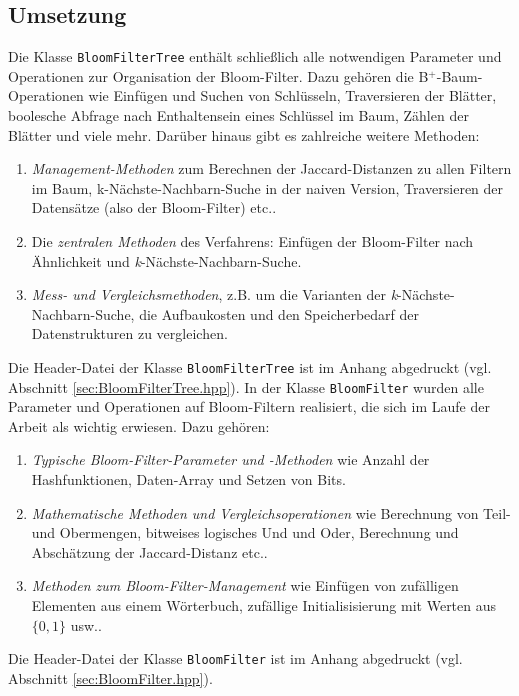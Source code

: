 \subsection{Umsetzung}\label{sec:umsetzung}
Die Klasse \texttt{BloomFilterTree} enthält schließlich alle notwendigen Parameter und Operationen zur Organisation der Bloom-Filter. Dazu gehören die B$^+$-Baum-Operationen wie Einfügen und Suchen von Schlüsseln, Traversieren der Blätter, boolesche Abfrage nach Enthaltensein eines Schlüssel im Baum, Zählen der Blätter und viele mehr. Darüber hinaus gibt es zahlreiche weitere Methoden: 
\begin{enumerate}
	\item \textit{Management-Methoden} zum Berechnen der Jaccard-Distanzen zu allen Filtern im Baum, k-Nächste-Nachbarn-Suche in der naiven Version, Traversieren der Datensätze (also der Bloom-Filter) etc..
	\item Die \textit{zentralen Methoden} des Verfahrens: Einfügen der Bloom-Filter nach Ähnlichkeit und \textit{k}-Nächste-Nachbarn-Suche. 
	\item \textit{Mess- und Vergleichsmethoden}, z.B. um die Varianten der \textit{k}-Nächste-Nachbarn-Suche, die Aufbaukosten und den Speicherbedarf der Datenstrukturen zu vergleichen. 
\end{enumerate}
Die Header-Datei der Klasse \texttt{BloomFilterTree} ist im Anhang abgedruckt (vgl. Abschnitt \ref{sec:BloomFilterTree.hpp}). In der Klasse \texttt{BloomFilter} wurden alle Parameter und Operationen auf Bloom-Filtern realisiert, die sich im Laufe der Arbeit als wichtig erwiesen. Dazu gehören: 
\begin{enumerate}
	\item \textit{Typische Bloom-Filter-Parameter und -Methoden} wie Anzahl der Hashfunktionen, Daten-Array und Setzen von Bits.
	\item \textit{Mathematische Methoden und Vergleichsoperationen} wie Berechnung von Teil- und Obermengen, bitweises logisches Und und Oder, Berechnung und Abschätzung der Jaccard-Distanz etc..
	\item \textit{Methoden zum Bloom-Filter-Management} wie Einfügen von zufälligen Elementen aus einem Wörterbuch, zufällige Initialisisierung mit Werten aus $\{0,1\}$ usw..
\end{enumerate}
Die Header-Datei der Klasse \texttt{BloomFilter} ist im Anhang abgedruckt (vgl. Abschnitt \ref{sec:BloomFilter.hpp}).
